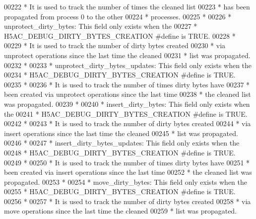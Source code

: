 \begin{DoxyCode}
00222 \textcolor{comment}{ *      It is used to track the number of times the cleaned list}
00223 \textcolor{comment}{ *      has been propagated from process 0 to the other}
00224 \textcolor{comment}{ *      processes.}
00225 \textcolor{comment}{ *}
00226 \textcolor{comment}{ * unprotect\_dirty\_bytes:  This field only exists when the}
00227 \textcolor{comment}{ *              H5AC\_DEBUG\_DIRTY\_BYTES\_CREATION #define is TRUE.}
00228 \textcolor{comment}{ *}
00229 \textcolor{comment}{ *      It is used to track the number of dirty bytes created}
00230 \textcolor{comment}{ *      via unprotect operations since the last time the cleaned}
00231 \textcolor{comment}{ *      list was propagated.}
00232 \textcolor{comment}{ *}
00233 \textcolor{comment}{ * unprotect\_dirty\_bytes\_updates: This field only exists when the}
00234 \textcolor{comment}{ *              H5AC\_DEBUG\_DIRTY\_BYTES\_CREATION #define is TRUE.}
00235 \textcolor{comment}{ *}
00236 \textcolor{comment}{ *      It is used to track the number of times dirty bytes have}
00237 \textcolor{comment}{ *      been created via unprotect operations since the last time}
00238 \textcolor{comment}{ *      the cleaned list was propagated.}
00239 \textcolor{comment}{ *}
00240 \textcolor{comment}{ * insert\_dirty\_bytes:  This field only exists when the}
00241 \textcolor{comment}{ *              H5AC\_DEBUG\_DIRTY\_BYTES\_CREATION #define is TRUE.}
00242 \textcolor{comment}{ *}
00243 \textcolor{comment}{ *      It is used to track the number of dirty bytes created}
00244 \textcolor{comment}{ *      via insert operations since the last time the cleaned}
00245 \textcolor{comment}{ *      list was propagated.}
00246 \textcolor{comment}{ *}
00247 \textcolor{comment}{ * insert\_dirty\_bytes\_updates:  This field only exists when the}
00248 \textcolor{comment}{ *              H5AC\_DEBUG\_DIRTY\_BYTES\_CREATION #define is TRUE.}
00249 \textcolor{comment}{ *}
00250 \textcolor{comment}{ *      It is used to track the number of times dirty bytes have}
00251 \textcolor{comment}{ *      been created via insert operations since the last time}
00252 \textcolor{comment}{ *      the cleaned list was propagated.}
00253 \textcolor{comment}{ *}
00254 \textcolor{comment}{ * move\_dirty\_bytes:  This field only exists when the}
00255 \textcolor{comment}{ *              H5AC\_DEBUG\_DIRTY\_BYTES\_CREATION #define is TRUE.}
00256 \textcolor{comment}{ *}
00257 \textcolor{comment}{ *      It is used to track the number of dirty bytes created}
00258 \textcolor{comment}{ *      via move operations since the last time the cleaned}
00259 \textcolor{comment}{ *      list was propagated.}

\end{DoxyCode}
